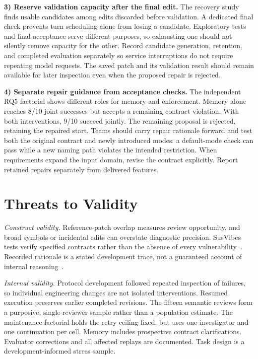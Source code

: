 \noindent\textbf{3) Reserve validation capacity after the final edit.}
The recovery study finds usable candidates among edits discarded before validation. A dedicated final check prevents turn scheduling alone from losing a candidate. Exploratory tests and final acceptance serve different purposes, so exhausting one should not silently remove capacity for the other. Record candidate generation, retention, and completed evaluation separately so service interruptions do not require repeating model requests. The saved patch and its validation result should remain available for later inspection even when the proposed repair is rejected.

\noindent\textbf{4) Separate repair guidance from acceptance checks.}
The independent RQ5 factorial shows different roles for memory and enforcement. Memory alone reaches 8/10 joint successes but accepts a remaining contract violation. With both interventions, 9/10 succeed jointly. The remaining proposal is rejected, retaining the repaired start. Teams should carry repair rationale forward and test both the original contract and newly introduced modes: a default-mode check can pass while a new naming path violates the intended restriction. When requirements expand the input domain, revise the contract explicitly. Report retained repairs separately from delivered features.

\section{Threats to Validity}
\label{sec:threats}
\emph{Construct validity.} Reference-patch overlap measures review opportunity, and broad symbols or incidental edits can overstate diagnostic precision. SusVibes tests verify specified contracts rather than the absence of every vulnerability~\cite{susvibes,susvibesartifact,repairsurvey,overfitting}. Recorded rationale is a stated development trace, not a guaranteed account of internal reasoning~\cite{turpin,lanham}.

\emph{Internal validity.} Protocol development followed repeated inspection of failures, so individual engineering changes are not isolated interventions. Resumed execution preserves earlier completed revisions. The fifteen semantic reviews form a purposive, single-reviewer sample rather than a population estimate. The maintenance factorial holds the retry ceiling fixed, but uses one investigator and one continuation per cell. Memory includes prospective contract clarifications. Evaluator corrections and all affected replays are documented. Task design is a development-informed stress sample.


